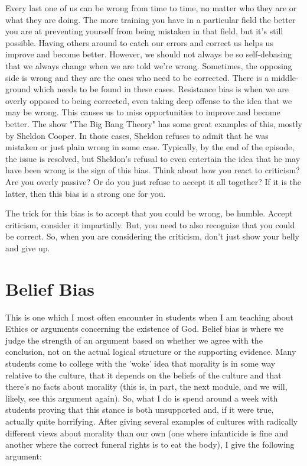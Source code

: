 Every last one of us can be wrong from time to time, no matter who they are or what they are doing. The more training you have in a particular field the better you are at preventing yourself from being mistaken in that field, but it's still possible. Having others around to catch our errors and correct us helps us improve and become better. However, we should not always be so self-debasing that we always change when we are told we're wrong. Sometimes, the opposing side is wrong and they are the ones who need to be corrected. There is a middle-ground which needs to be found in these cases. Resistance bias is when we are overly opposed to being corrected, even taking deep offense to the idea that we may be wrong. This causes us to miss opportunities to improve and become better. The show "The Big Bang Theory" has some great examples of this, mostly by Sheldon Cooper. In those cases, Sheldon refuses to admit that he was mistaken or just plain wrong in some case. Typically, by the end of the episode, the issue is resolved, but Sheldon's refusal to even entertain the idea that he may have been wrong is the sign of this bias. Think about how you react to criticism? Are you overly passive? Or do you just refuse to accept it all together? If it is the latter, then this bias is a strong one for you. 

The trick for this bias is to accept that you could be wrong, be humble. Accept criticism, consider it impartially. But, you need to also recognize that you could be correct. So, when you are considering the criticism, don't just show your belly and give up.

\section{Belief Bias}

This is one which I most often encounter in students when I am teaching about Ethics or arguments concerning the existence of God. Belief bias is where we judge the strength of an argument based on whether we agree with the conclusion, not on the actual logical structure or the supporting evidence. Many students come to college with the 'woke' idea that morality is in some way relative to the culture, that it depends on the beliefs of the culture and that there's no facts about morality (this is, in part, the next module, and we will, likely, see this argument again). So, what I do is spend around a week with students proving that this stance is both unsupported and, if it were true, actually quite horrifying. After giving several examples of cultures with radically different views about morality than our own (one where infanticide is fine and another where the correct funeral rights is to eat the body), I give the following argument:


